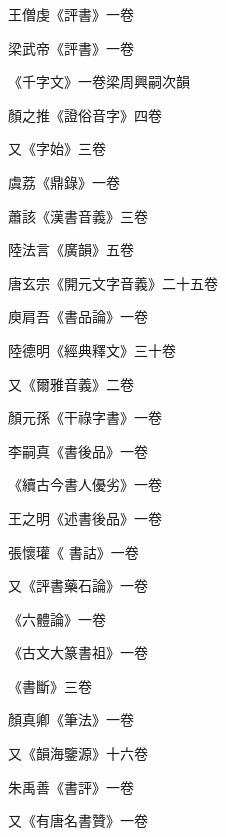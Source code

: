 \begin{pinyinscope}
 王僧虔《評書》一卷



 梁武帝《評書》一卷



 《千字文》一卷梁周興嗣次韻



 顏之推《證俗音字》四卷



 又《字始》三卷



 虞荔《鼎錄》一卷



 蕭該《漢書音義》三卷



 陸法言《廣韻》五卷



 唐玄宗《開元文字音義》二十五卷



 庾肩吾《書品論》一卷



 陸德明《經典釋文》三十卷



 又《爾雅音義》二卷



 顏元孫《干祿字書》一卷



 李嗣真《書後品》一卷



 《續古今書人優劣》一卷



 王之明《述書後品》一卷



 張懷瓘《
 書詁》一卷



 又《評書藥石論》一卷



 《六體論》一卷



 《古文大篆書祖》一卷



 《書斷》三卷



 顏真卿《筆法》一卷



 又《韻海鑒源》十六卷



 朱禹善《書評》一卷



 又《有唐名書贊》一卷




\end{pinyinscope}
